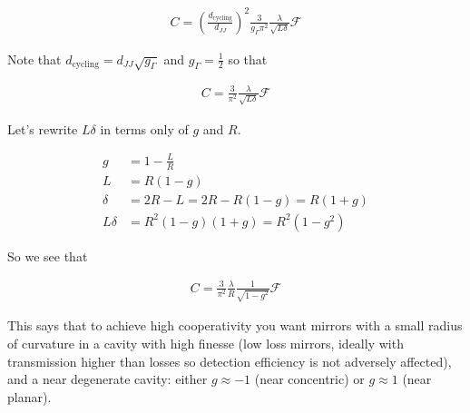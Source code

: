 \documentclass[12pt]{article}
\begin{document}
\begin{align}
C = \left(\frac{d_{\text{cycling}}}{d_{JJ}}\right)^2 \frac{3}{g_{\Gamma}\pi^2} \frac{\lambda}{\sqrt{L\delta}} \mathcal{F}
\end{align}

Note that $d_{\text{cycling}} = d_{JJ}\sqrt{g_{\Gamma}}$ and $g_{\Gamma} = \frac{1}{2}$ so that

\begin{align}
C = \frac{3}{\pi^2} \frac{\lambda}{\sqrt{L\delta}} \mathcal{F}
\end{align}

Let's rewrite $L\delta$ in terms only of $g$ and $R$.

\begin{align}
g &= 1 - \frac{L}{R}\\
L &= R(1-g)\\
\delta &= 2R - L = 2R - R(1-g) = R(1+g)\\
L\delta &= R^2(1-g)(1+g) = R^2(1-g^2)
\end{align}

So we see that

\begin{align}
C = \frac{3}{\pi^2} \frac{\lambda}{R} \frac{1}{\sqrt{1-g^2}} \mathcal{F}
\end{align}

This says that to achieve high cooperativity you want mirrors with a small radius of curvature in a cavity with high finesse (low loss mirrors, ideally with transmission higher than losses so detection efficiency is not adversely affected), and a near degenerate cavity: either $g \approx -1$ (near concentric) or $g\approx 1$ (near planar).
\end{document}
